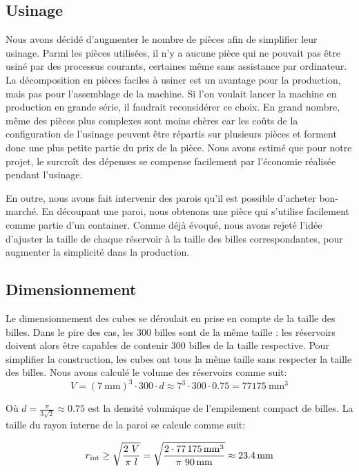 \subsection{Usinage}
Nous avons décidé d'augmenter le nombre de pièces afin de simplifier leur usinage. Parmi les pièces utilisées, il n'y a aucune pièce qui ne pouvait pas être usiné par des processus courants, certaines même sans assistance par ordinateur. La décomposition en pièces faciles à usiner est un avantage pour la production, mais pas pour l'assemblage de la machine. Si l'on voulait lancer la machine en production en grande série, il faudrait reconsidérer ce choix. En grand nombre, même des pièces plus complexes sont moins chères car les coûts de la configuration de l'usinage peuvent être répartis sur plusieurs pièces et forment donc une plus petite partie du prix de la pièce. Nous avons estimé que pour notre projet, le surcroît des dépenses se compense facilement par l'économie réalisée pendant l'usinage.

En outre, nous avons fait intervenir des parois qu'il est possible d'acheter bon-marché. En découpant une paroi, nous obtenons une pièce qui s'utilise facilement comme partie d'un container. Comme déjà évoqué, nous avons rejeté l'idée d'ajuster la taille de chaque réservoir à la taille des billes correspondantes, pour augmenter la simplicité dans la production. 

\subsection{Dimensionnement}
Le dimensionnement des cubes se déroulait en prise en compte de la taille des billes. Dans le pire des cas, les \num{300} billes sont de la même taille : les réservoirs doivent alors être capables de contenir \num{300} billes de la taille respective. Pour simplifier la construction, les cubes ont tous la même taille sans respecter la taille des billes.
Nous avons calculé le volume des réservoirs comme suit:
\begin{equation}
    V = (\SI{7}{\mm})^3 \cdot \num{300} \cdot d \approx 7^3 \cdot \num{300} \cdot \num{0.75} = \SI{77175}{\mm\cubed}
    \label{eq:volumereservoirfin}
\end{equation}

Où \(d = \frac{\pi}{3\sqrt{2}} \approx \num{0.75}\) est la densité volumique de l'empilement compact de billes.
La taille du rayon interne de la paroi se calcule comme suit:

\begin{equation}r\textsubscript{int} \geq \sqrt{\frac{2\ V}{\pi\ l}}=\sqrt{\frac{2 \cdot \SI{77175}{\mm\cubed}}{\pi\ \SI{90}{\mm}}} \approx \SI{23.4}{\mm} \label{eq:rayonreservoirfin}\end{equation}

